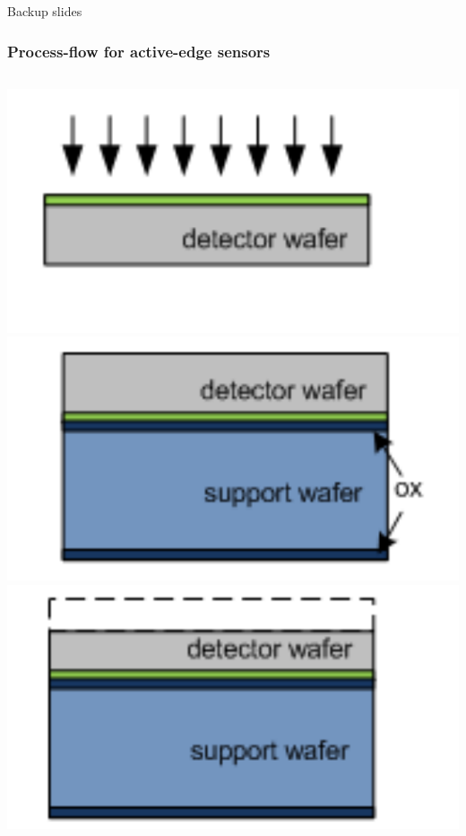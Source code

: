 \begin{frame}

  \centering
  \Huge{Backup slides}

\end{frame}

\begin{frame}
  \frametitle{Process-flow for active-edge sensors}
  
  \begin{columns}
    \centering
    \includegraphics[width=\textwidth]{../figures/ActiveEdge/advacamProcess/wafer_1.pdf}\\
    \includegraphics[width=\textwidth]{../figures/ActiveEdge/advacamProcess/wafer_2.pdf}\\
    \includegraphics[width=\textwidth]{../figures/ActiveEdge/advacamProcess/wafer_3.pdf}


\end{columns}
\end{frame}
